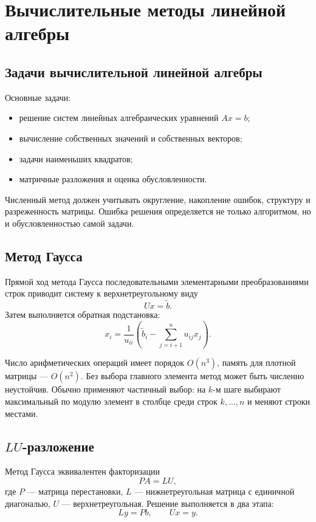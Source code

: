 \section{Вычислительные методы линейной алгебры}
\label{sec:numerical-linear-algebra}

\subsection{Задачи вычислительной линейной алгебры}

Основные задачи:
\begin{itemize}
    \item решение систем линейных алгебраических уравнений $Ax=b$;
    \item вычисление собственных значений и собственных векторов;
    \item задачи наименьших квадратов;
    \item матричные разложения и оценка обусловленности.
\end{itemize}

Численный метод должен учитывать округление, накопление ошибок, структуру и
разреженность матрицы. Ошибка решения определяется не только алгоритмом, но и
обусловленностью самой задачи.

\subsection{Метод Гаусса}

Прямой ход метода Гаусса последовательными элементарными преобразованиями строк
приводит систему к верхнетреугольному виду
\[
    Ux=\widetilde b.
\]
Затем выполняется обратная подстановка:
\[
    x_i=\frac{1}{u_{ii}}
    \left(\widetilde b_i-\sum_{j=i+1}^{n}u_{ij}x_j\right).
\]

Число арифметических операций имеет порядок $O(n^3)$, память для плотной матрицы
--- $O(n^2)$. Без выбора главного элемента метод может быть численно неустойчив.
Обычно применяют частичный выбор: на $k$-м шаге выбирают максимальный по модулю
элемент в столбце среди строк $k,\ldots,n$ и меняют строки местами.

\subsection{$LU$-разложение}

Метод Гаусса эквивалентен факторизации
\[
    PA=LU,
\]
где $P$ --- матрица перестановки, $L$ --- нижнетреугольная матрица с единичной
диагональю, $U$ --- верхнетреугольная. Решение выполняется в два этапа:
\[
    Ly=Pb,
    \qquad
    Ux=y.
\]

